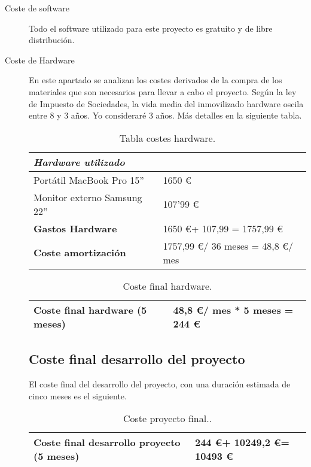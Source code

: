 \begin{description}
	\item[Coste de software] Todo el software utilizado para este proyecto es gratuito y de libre distribución. 
	
	\item[Coste de Hardware] En este apartado se analizan los costes derivados de la compra de los materiales que son necesarios para llevar a cabo el proyecto. Según la ley de Impuesto de Sociedades, la vida media del inmovilizado  hardware oscila entre 8 y 3 a\~nos. Yo consideraré 3 años. Más detalles en la siguiente tabla.  
	
\begin{table}[htbp]
\begin{center}
\begin{tabular}{|l|l|}
\hline
 \emph{Hardware utilizado}&  \\
\hline \hline
 Portátil MacBook Pro 15'' & 1650 \euro  \\ \hline
Monitor externo Samsung 22'' &    107'99 \euro\\ \hline
\textbf{Gastos Hardware}  &   1650 \euro + 107,99  =  1757,99 \euro \\ \hline
\textbf{Coste amortización}  &  1757,99 \euro  / 36 meses = 48,8 \euro / mes  \\ \hline
\end{tabular}
\caption{Tabla costes hardware.}
\label{tabla:hardware}
\end{center}
\end{table}

\begin{table}[htbp]
\begin{center}
\begin{tabular}{|l|l|}
\hline
\textbf{Coste final hardware} (5 meses)  &  48,8 \euro / mes  *  5 meses = 244 \euro   \\ \hline
\end{tabular}
\caption{Coste final hardware.}
\label{tabla:costefinalhardware}
\end{center}
\end{table}


\subsection{Coste final desarrollo del proyecto}\label{coste-final}

El coste final del desarrollo del proyecto, con una duración estimada de cinco meses es el siguiente.  

\begin{table}[htb]
\begin{center}
\begin{tabular}{|l|l|}
\hline
\textbf{Coste final desarrollo proyecto} (5 meses)  &  244 \euro +  10249,2 \euro = 10493 \euro   \\ \hline
\end{tabular}
\caption{Coste proyecto final..}
\label{tabla:costefinal}
\end{center}
\end{table}

\end{description}

